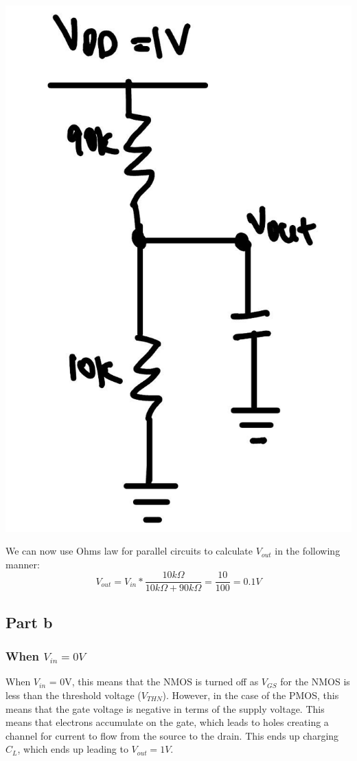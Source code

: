 \documentclass{article}
\begin{document}
\includegraphics[scale = 0.2]{circuit2.jpg}

We can now use Ohms law for parallel circuits to calculate $V_{out}$ in the following manner:
\begin{equation}
    V_{out} = V_{in} * \frac{10k\Omega}{10k\Omega + 90k\Omega} = \frac{10}{100} = 0.1V
\end{equation}

\subsection*{Part b}
\subsubsection*{When $V_{in} = 0V$}
When $V_{in}$ = 0V, this means that the NMOS is turned off as $V_{GS}$ for the NMOS is less than the threshold voltage ($V_{THN}$).
However, in the case of the PMOS, this means that the gate voltage is negative in terms of the supply voltage. This means that electrons accumulate on the gate, which leads to holes creating a channel for current to flow from the source to the drain.
This ends up charging $C_{L}$, which ends up leading to $V_{out} = 1V$.
\end{document}
